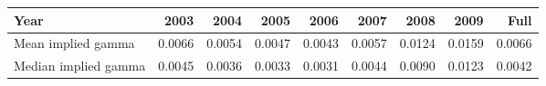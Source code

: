 \begin{tabular}{l|rrrrrrrr}
\toprule
Year & 2003 & 2004 & 2005 & 2006 & 2007 & 2008 & 2009 & Full \\
\midrule
Mean implied gamma & 0.0066 & 0.0054 & 0.0047 & 0.0043 & 0.0057 & 0.0124 & 0.0159 & 0.0066 \\
Median implied gamma & 0.0045 & 0.0036 & 0.0033 & 0.0031 & 0.0044 & 0.0090 & 0.0123 & 0.0042 \\
\bottomrule
\end{tabular}
